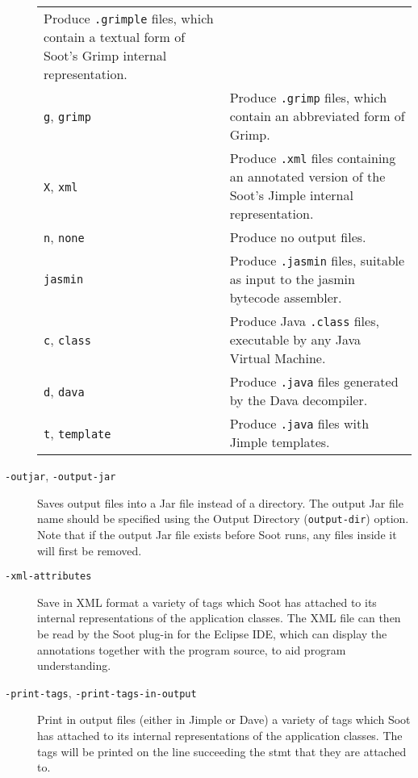 \documentclass{article}
\begin{document}
\begin{description}
\begin{longtable}{p{1in}p{4in}}
Produce {\tt .grimple} files, which contain a textual
form of Soot's Grimp internal representation.
\\
{\tt g}, {\tt grimp} 
&

Produce {\tt .grimp} files, which contain an abbreviated form
of Grimp.
\\
{\tt X}, {\tt xml} 
&

Produce {\tt .xml} files containing an annotated
version of the Soot's Jimple internal representation.
\\
{\tt n}, {\tt none} 
&

Produce no output files.
\\
{\tt jasmin} 
&

Produce {\tt .jasmin} files, suitable as input to the jasmin
bytecode assembler.
\\
{\tt c}, {\tt class} 
&

Produce Java {\tt .class} files, executable by any Java
Virtual Machine.
\\
{\tt d}, {\tt dava} 
&

Produce {\tt .java} files generated by the Dava decompiler.
\\
{\tt t}, {\tt template} 
&

Produce {\tt .java} files with Jimple templates.
\\

\end{longtable}


  \item[
  {\tt -outjar}, 
  {\tt -output-jar}]

Saves output files into a Jar file instead of a directory. The output
Jar file name should be specified using the Output Directory
({\tt output-dir}) option. Note that if the output Jar file exists
before Soot runs, any files inside it will first be removed.



  \item[
  {\tt -xml-attributes}]

Save in XML format a variety of tags which Soot has attached to
its internal representations of the application classes. The XML
file can then be read by the Soot plug-in for the Eclipse IDE,
which can display the annotations together with the program
source, to aid program understanding.



  \item[
  {\tt -print-tags}, 
  {\tt -print-tags-in-output}]

Print in output files (either in Jimple or Dave) a variety of tags which
Soot has attached to
its internal representations of the application classes. The tags will
be printed on the line succeeding the stmt that they are attached to.




\end{description}
\end{document}
